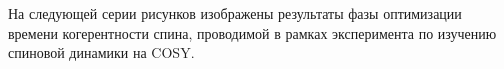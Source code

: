 
На следующей серии рисунков изображены результаты фазы оптимизации времени когерентности спина,
проводимой в рамках эксперимента по изучению спиновой динамики на COSY.